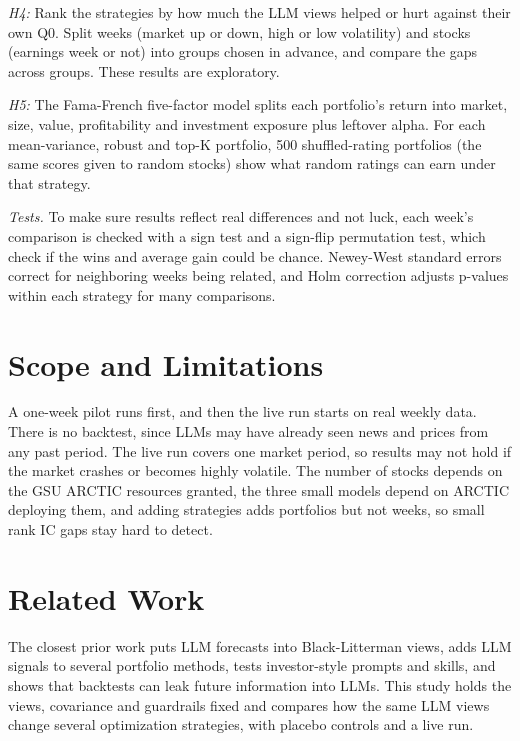 \documentclass[conference]{IEEEtran}
\begin{document}
\textit{H4:} Rank the strategies by how much the LLM views helped or hurt against their own Q0. Split weeks (market up or down, high or low volatility) and stocks (earnings week or not) into groups chosen in advance, and compare the gaps across groups. These results are exploratory.

\textit{H5:} The Fama-French five-factor model splits each portfolio's return into market, size, value, profitability and investment exposure plus leftover alpha. For each mean-variance, robust and top-K portfolio, 500 shuffled-rating portfolios (the same scores given to random stocks) show what random ratings can earn under that strategy.

\textit{Tests.} To make sure results reflect real differences and not luck, each week's comparison is checked with a sign test and a sign-flip permutation test, which check if the wins and average gain could be chance. Newey-West standard errors correct for neighboring weeks being related, and Holm correction adjusts p-values within each strategy for many comparisons.

\section{Scope and Limitations}
A one-week pilot runs first, and then the live run starts on real weekly data. There is no backtest, since LLMs may have already seen news and prices from any past period. The live run covers one market period, so results may not hold if the market crashes or becomes highly volatile. The number of stocks depends on the GSU ARCTIC resources granted, the three small models depend on ARCTIC deploying them, and adding strategies adds portfolios but not weeks, so small rank IC gaps stay hard to detect.

\section{Related Work}
The closest prior work puts LLM forecasts into Black-Litterman views, adds LLM signals to several portfolio methods, tests investor-style prompts and skills, and shows that backtests can leak future information into LLMs. This study holds the views, covariance and guardrails fixed and compares how the same LLM views change several optimization strategies, with placebo controls and a live run.
\end{document}
